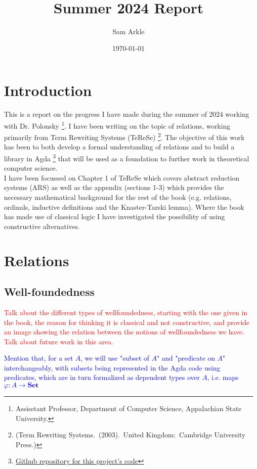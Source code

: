 \documentclass{scrartcl}
\title{Summer 2024 Report}
\author{Sam Arkle}
\date{\today}
\newcommand{\bset}{\mathbf{Set}}
\newcommand{\sacomment}[1]{\textcolor{red}{#1}}
\newcommand{\apcomment}[1]{\textcolor{blue}{#1}}
\begin{document}
\maketitle

\section{Introduction}
This is a report on the progress I have made during the summer of 2024 working with Dr. Polonsky \footnote{Assisstant Professor, Department of Computer Science, Appalachian State University.}. I have been writing on the topic of relations, working primarily from Term Rewriting Systems (TeReSe) \footnote{(Term Rewriting Systems. (2003). United Kingdom: Cambridge University Press.)}.
The objective of this work has been to both develop a formal understanding of relations and to build a library in Agda \footnote{\href{https://github.com/DrPolonsky/LAM/tree/main/Relations}{Github repository for this project's code}} that will be used as a foundation to further work in theoretical computer science.
\\
I have been focussed on Chapter 1 of TeReSe which covers abstract reduction systems (ARS) as well as the appendix (sections 1-3) which provides the necessary mathematical background for the rest of the book (e.g. relations, ordinals, inductive definitions and the Knaster-Tarski lemma). Where the book has made use of classical logic I have investigated the possibility of using constructive alternatives.

\section{Relations}

\subsection{Well-foundedness}
\sacomment{Talk about the different types of wellfoundedness, starting with the one given in the book, the reason for thinking it is classical and not constructive, and provide an image showing the relation between the notions of wellfoundedness we have. Talk about future work in this area.}

\apcomment{Mention that, for a set $A$, we will use "subset of $A$" and "predicate on $A$" interchangeably,
with subsets being represented in the Agda code using predicates, which are in turn formalized as
dependent types over $A$, i.e. maps $\varphi : A \to \bset$ }
\end{document}
